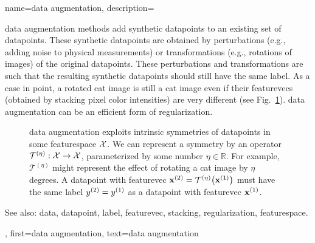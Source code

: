 {name={data augmentation},
	description={\Gls{data} augmentation methods add synthetic \glspl{datapoint} 
		to an existing set of \glspl{datapoint}. These synthetic \glspl{datapoint} are obtained by 
		perturbations (e.g., adding noise to physical measurements) or transformations 
		(e.g., rotations of images) of the original \glspl{datapoint}. These perturbations and 
		transformations are such that the resulting synthetic \glspl{datapoint} should 
		still have the same \gls{label}. As a case in point, a rotated cat image is still 
		a cat image even if their \glspl{featurevec} (obtained by \gls{stacking} pixel color intensities) 
		are very different (see Fig.\ \ref{fig_symmetry_dataaug_dict}). \Gls{data} augmentation can be an 
		efficient form of \gls{regularization}.
		\begin{figure}[H]
		\begin{center}
			  \vspace*{-11mm}
		\end{center}
		\caption{\Gls{data} augmentation exploits intrinsic symmetries of \glspl{datapoint} in 
			some \gls{featurespace} $\mathcal{X}$. We can represent a symmetry by 
		    	an \gls{operator} $\mathcal{T}^{(\eta)}: \mathcal{X} \rightarrow \mathcal{X}$,
		    	parameterized by some number $\eta \in \mathbb{R}$. For example, $\mathcal{T}^{(\eta)}$ 
		    	might represent the effect of rotating a cat image by $\eta$ degrees. A \gls{datapoint} 
		    	with \gls{featurevec} ${\bf x}^{(2)} = \mathcal{T}^{(\eta)} \big({\bf x}^{(1)} \big)$ must 
		    	have the same \gls{label} $y^{(2)}=y^{(1)}$ as a \gls{datapoint} 
		   	 with \gls{featurevec} ${\bf x}^{(1)}$.\label{fig_symmetry_dataaug_dict}}
		 \end{figure}
		See also: \gls{data}, \gls{datapoint}, \gls{label}, \gls{featurevec}, \gls{stacking}, \gls{regularization}, \gls{featurespace}. },
	first={data augmentation},
	text={data augmentation}
}
	
